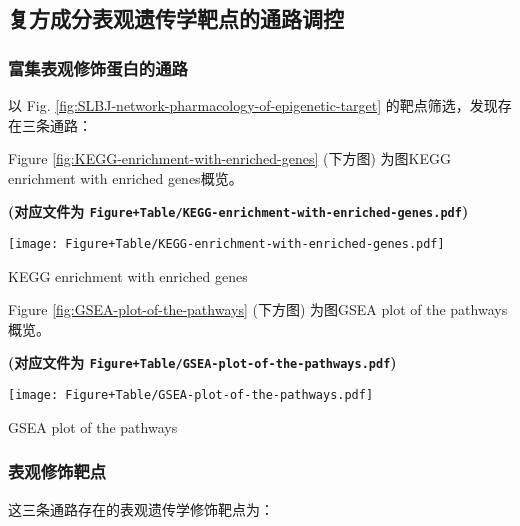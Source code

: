 \documentclass[
]{article}
\begin{document}
\hypertarget{ux590dux65b9ux6210ux5206ux8868ux89c2ux9057ux4f20ux5b66ux9776ux70b9ux7684ux901aux8defux8c03ux63a7}{%
\subsection{复方成分表观遗传学靶点的通路调控}\label{ux590dux65b9ux6210ux5206ux8868ux89c2ux9057ux4f20ux5b66ux9776ux70b9ux7684ux901aux8defux8c03ux63a7}}

\hypertarget{ux5bccux96c6ux8868ux89c2ux4feeux9970ux86cbux767dux7684ux901aux8def}{%
\subsubsection{富集表观修饰蛋白的通路}\label{ux5bccux96c6ux8868ux89c2ux4feeux9970ux86cbux767dux7684ux901aux8def}}

以 Fig. \ref{fig:SLBJ-network-pharmacology-of-epigenetic-target}
的靶点筛选，发现存在三条通路：

Figure \ref{fig:KEGG-enrichment-with-enriched-genes} (下方图) 为图KEGG enrichment with enriched genes概览。

\textbf{(对应文件为 \texttt{Figure+Table/KEGG-enrichment-with-enriched-genes.pdf})}

\def\@captype{figure}
\begin{center}
\texttt{[image: Figure+Table/KEGG-enrichment-with-enriched-genes.pdf]}
\caption{KEGG enrichment with enriched genes}\label{fig:KEGG-enrichment-with-enriched-genes}
\end{center}

Figure \ref{fig:GSEA-plot-of-the-pathways} (下方图) 为图GSEA plot of the pathways概览。

\textbf{(对应文件为 \texttt{Figure+Table/GSEA-plot-of-the-pathways.pdf})}

\def\@captype{figure}
\begin{center}
\texttt{[image: Figure+Table/GSEA-plot-of-the-pathways.pdf]}
\caption{GSEA plot of the pathways}\label{fig:GSEA-plot-of-the-pathways}
\end{center}

\hypertarget{epi-tar}{%
\subsubsection{表观修饰靶点}\label{epi-tar}}

这三条通路存在的表观遗传学修饰靶点为：
\end{document}
